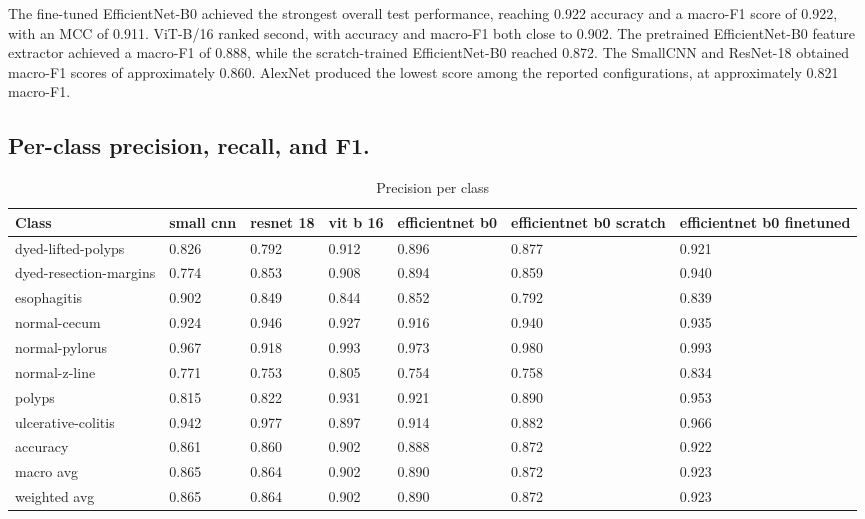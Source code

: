 \documentclass[conference]{IEEEtran}
\begin{document}
The fine-tuned EfficientNet-B0 achieved the strongest overall test performance, reaching 0.922 accuracy and a macro-F1 score of 0.922, with an MCC of 0.911. ViT-B/16 ranked second, with accuracy and macro-F1 both close to 0.902. The pretrained EfficientNet-B0 feature extractor achieved a macro-F1 of 0.888, while the scratch-trained EfficientNet-B0 reached 0.872. The SmallCNN and ResNet-18 obtained macro-F1 scores of approximately 0.860. AlexNet produced the lowest score among the reported configurations, at approximately 0.821 macro-F1.

\subsection{Per-class precision, recall, and F1.}

\begin{table}[htbp]
\caption{Precision per class}
\begin{center}
\begin{tabular}{|m{4em}|m{2em}|m{2em}|m{1.8em}|m{4em}|m{4em}|m{4em}|}
\hline
\textbf{Class}&small cnn & resnet 18 & vit b 16 & efficientnet b0 & efficientnet b0 scratch & efficientnet b0 finetuned\\
\hline
dyed-lifted-polyps & 0.826 & 0.792 & 0.912 & 0.896 & 0.877 & 0.921 \\
dyed-resection-margins & 0.774 & 0.853 & 0.908 & 0.894 & 0.859 & 0.940 \\
esophagitis & 0.902 & 0.849 & 0.844 & 0.852 & 0.792 & 0.839 \\
normal-cecum & 0.924 & 0.946 & 0.927 & 0.916 & 0.940 & 0.935 \\
normal-pylorus & 0.967 & 0.918 & 0.993 & 0.973 & 0.980 & 0.993 \\
normal-z-line & 0.771 & 0.753 & 0.805 & 0.754 & 0.758 & 0.834 \\
polyps & 0.815 & 0.822 & 0.931 & 0.921 & 0.890 & 0.953 \\
ulcerative-colitis & 0.942 & 0.977 & 0.897 & 0.914 & 0.882 & 0.966 \\
accuracy & 0.861 & 0.860 & 0.902 & 0.888 & 0.872 & 0.922 \\
macro avg & 0.865 & 0.864 & 0.902 & 0.890 & 0.872 & 0.923 \\
weighted avg & 0.865 & 0.864 & 0.902 & 0.890 & 0.872 & 0.923 \\
\hline
\end{tabular}
\label{tables:tab5}
\end{center}
\end{table}
\end{document}
